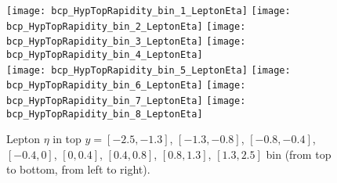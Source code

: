 \begin{landscape}
\begin{figure}
  \texttt{[image: bcp\_HypTopRapidity\_bin\_1\_LeptonEta]}
  \texttt{[image: bcp\_HypTopRapidity\_bin\_2\_LeptonEta]}
  \texttt{[image: bcp\_HypTopRapidity\_bin\_3\_LeptonEta]}
  \texttt{[image: bcp\_HypTopRapidity\_bin\_4\_LeptonEta]}\\
  \texttt{[image: bcp\_HypTopRapidity\_bin\_5\_LeptonEta]}
  \texttt{[image: bcp\_HypTopRapidity\_bin\_6\_LeptonEta]}
  \texttt{[image: bcp\_HypTopRapidity\_bin\_7\_LeptonEta]}
  \texttt{[image: bcp\_HypTopRapidity\_bin\_8\_LeptonEta]}
\caption{Lepton $\eta$ in top $y = [-2.5,-1.3]$, $[-1.3,-0.8]$, $[-0.8,-0.4]$, $[-0.4,0]$, $[0,0.4]$, $[0.4,0.8]$, $[0.8,1.3]$, $[1.3,2.5]$ bin (from top to bottom, from left to right).}
\end{figure}

\clearpage
\newpage



\end{landscape}

